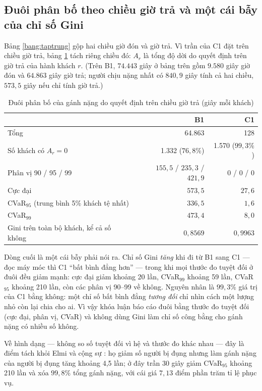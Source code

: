 \subsection{Đuôi phân bố theo chiều giờ trả và một cái bẫy của chỉ số Gini}
\label{muc:duoi}

Bảng \ref{bang:taptrung} gộp hai chiều giờ đón và giờ trả. Vì trần của C1 đặt trên chiều giờ trả,
bảng \ref{bang:duoi} tách riêng chiều đó: $A_r$ là tổng độ dời do quyết định trên giờ trả của hành
khách $r$. (Trên B1, $74.443$ giây ở bảng trên gồm $9.580$ giây giờ đón và $64.863$ giây giờ trả;
người chịu nặng nhất có $840{,}9$ giây tính cả hai chiều, $573{,}5$ giây nếu chỉ tính giờ trả.)

\begin{table}[htbp]
\centering
\caption{Đuôi phân bố của gánh nặng do quyết định trên chiều giờ trả (giây mỗi khách)}
\label{bang:duoi}
\small
\begin{tabular}{@{}lrr@{}}
\toprule
& \textbf{B1} & \textbf{C1}\\
\midrule
Tổng & 64.863 & 128\\
Số khách có $A_r = 0$ & 1.332 ($76{,}8\%$) & 1.570 ($99{,}3\%$)\\
Phân vị 90 / 95 / 99 & $155{,}5$ / $235{,}3$ / $421{,}9$ & 0 / 0 / 0\\
Cực đại & $573{,}5$ & $27{,}6$\\
CVaR$_{95}$ (trung bình 5\% khách tệ nhất) & $336{,}5$ & $1{,}6$\\
CVaR$_{99}$ & $473{,}4$ & $8{,}0$\\
\midrule
Gini trên toàn bộ khách, kể cả số không & $0{,}8569$ & $0{,}9963$\\
\bottomrule
\end{tabular}
\end{table}

Dòng cuối là một cái bẫy phải nói ra. Chỉ số Gini \emph{tăng} khi đi từ B1 sang C1 --- đọc máy móc
thì C1 ``bất bình đẳng hơn'' --- trong khi mọi thước đo tuyệt đối ở đuôi đều giảm mạnh: cực đại
giảm khoảng 20 lần, CVaR$_{99}$ khoảng 59 lần, CVaR$_{95}$ khoảng 210 lần, còn các phân vị 90--99
về không.
Nguyên nhân là $99{,}3\%$ giá trị của C1 bằng không: một chỉ số bất bình đẳng \emph{tương đối} chỉ
nhìn cách một lượng nhỏ còn lại chia cho ai. Vì vậy khóa luận báo cáo đuôi bằng thước đo tuyệt đối
(cực đại, phân vị, CVaR) và không dùng Gini làm chỉ số công bằng cho gánh nặng có nhiều số không.

Về hình dạng --- không so số tuyệt đối vì hệ và thước đo khác nhau --- đây là điểm tách khỏi Elmi và
cộng sự \cite{elmi2026}: họ giảm số người bị đụng nhưng làm gánh nặng của người bị đụng tăng khoảng
4,5 lần; ở đây trần 30 giây giảm CVaR$_{95}$ khoảng 210 lần và xóa $99{,}8\%$ tổng gánh nặng, với
cái giá $7{,}13$ điểm phần trăm tỉ lệ phục vụ.

